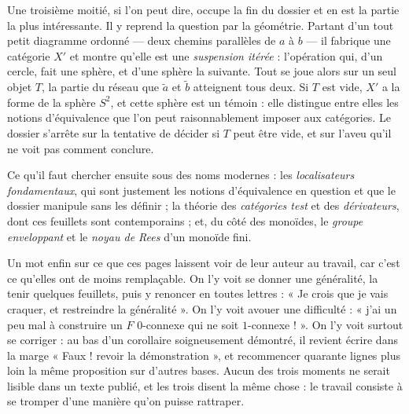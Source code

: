 \documentclass[11pt,a4paper]{article}
\begin{document}
\begin{resume}
Une troisième moitié, si l'on peut dire, occupe la fin du dossier et en est
la partie la plus intéressante. Il y reprend la question par la géométrie.
Partant d'un tout petit diagramme ordonné — deux chemins parallèles de $a$ à
$b$ — il fabrique une catégorie $X'$ et montre qu'elle est une
\emph{suspension itérée} : l'opération qui, d'un cercle, fait une sphère, et
d'une sphère la suivante. Tout se joue alors sur un seul objet $T$, la partie
du réseau que $\tilde a$ et $\tilde b$ atteignent tous deux. Si $T$ est vide,
$X'$ a la forme de la sphère $S^{2}$, et cette sphère est un témoin : elle
distingue entre elles les notions d'équivalence que l'on peut raisonnablement
imposer aux catégories. Le dossier s'arrête sur la tentative de décider si
$T$ peut être vide, et sur l'aveu qu'il ne voit pas comment conclure.

Ce qu'il faut chercher ensuite sous des noms modernes : les
\emph{localisateurs fondamentaux}, qui sont justement les notions
d'équivalence en question et que le dossier manipule sans les définir ; la
théorie des \emph{catégories test} et des \emph{dérivateurs}, dont ces
feuillets sont contemporains ; et, du côté des monoïdes, le
\emph{groupe enveloppant} et le \emph{noyau de Rees} d'un monoïde fini.

Un mot enfin sur ce que ces pages laissent voir de leur auteur au travail,
car c'est ce qu'elles ont de moins remplaçable. On l'y voit se donner une
généralité, la tenir quelques feuillets, puis y renoncer en toutes lettres :
« Je crois que je vais craquer, et restreindre la généralité ». On l'y voit
avouer une difficulté : « j'ai un peu mal à construire un $F$ $0$-connexe qui
ne soit $1$-connexe ! ». On l'y voit surtout se corriger : au bas d'un
corollaire soigneusement démontré, il revient écrire dans la marge
« Faux ! revoir la démonstration », et recommencer quarante lignes plus loin
la même proposition sur d'autres bases. Aucun des trois moments ne serait
lisible dans un texte publié, et les trois disent la même chose : le travail
consiste à se tromper d'une manière qu'on puisse rattraper.

\end{resume}
\end{document}
